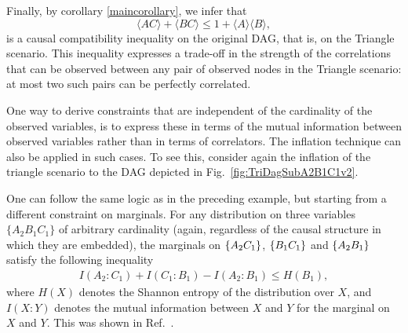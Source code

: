 Finally, by corollary \ref{maincorollary}, we infer that 
\begin{equation}
	\label{eq:polymonogamy}
	\langle A C\rangle + \langle B C\rangle \leq 1 + \langle A\rangle \langle B\rangle,
\end{equation}
is a causal compatibility inequality on the original DAG, that is, on the Triangle scenario.   This inequality expresses a trade-off in the strength of the correlations that can be observed between any pair of observed nodes in the Triangle scenario: at most two such pairs can be perfectly correlated. %


\smallskip\nobreak

One way to derive constraints that are independent of the cardinality of the observed variables, is to express these in terms of the mutual information between observed variables rather than in terms of correlators.  The inflation technique can also be applied in such cases.
To see this, consider again the inflation of the triangle scenario to the DAG depicted in Fig.~\ref{fig:TriDagSubA2B1C1v2}.  

One can follow the same logic as in the preceding example, but starting from a different constraint on marginals.  For any distribution on three variables $\{A_2 B_1 C_1\}$ of arbitrary cardinality (again, regardless of the causal structure in which they are embedded), the marginals on $\left\lbrace A_2 C_1\right\rbrace$, $\left\lbrace B_1 C_1\right\rbrace$ and $\left\lbrace A_2 B_1\right\rbrace$ satisfy the following inequality
\begin{align}\label{eq:MIraw}
	I(A_2 : C_1) + I(C_1 : B_1) - I(A_2 : B_1) \leq H(B_1),	
\end{align}
where $H(X)$ denotes the Shannon entropy of the distribution over $X$, and $I(X: Y)$ denotes the mutual information between $X$ and $Y$ for the marginal on $X$ and $Y$.  This was shown in Ref.~\cite{fritz2013marginal}.

